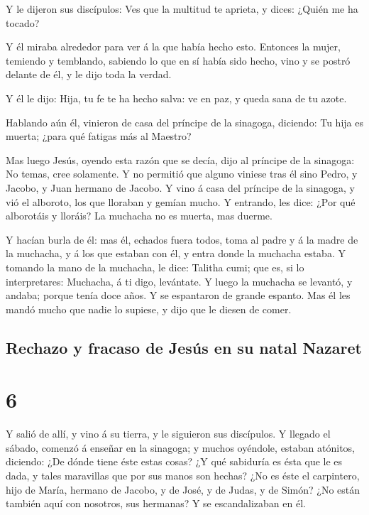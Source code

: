  Y le dijeron sus discípulos: Ves que la multitud te
aprieta, y dices: ¿Quién me ha tocado?

 Y él miraba alrededor para ver á la que había hecho
esto.  Entonces la mujer, temiendo y temblando, sabiendo
lo que en sí había sido hecho, vino y se postró delante de él, y le dijo
toda la verdad.

 Y él le dijo: Hija, tu fe te ha hecho salva: ve en paz,
y queda sana de tu azote.

 Hablando aún él, vinieron de casa del príncipe de la
sinagoga, diciendo: Tu hija es muerta; ¿para qué fatigas más al Maestro?

 Mas luego Jesús, oyendo esta razón que se decía, dijo al
príncipe de la sinagoga: No temas, cree solamente.  Y no
permitió que alguno viniese tras él sino Pedro, y Jacobo, y Juan hermano
de Jacobo.  Y vino á casa del príncipe de la sinagoga, y
vió el alboroto, los que lloraban y gemían mucho.  Y
entrando, les dice: ¿Por qué alborotáis y lloráis? La muchacha no es
muerta, mas duerme.

 Y hacían burla de él: mas él, echados fuera todos, toma
al padre y á la madre de la muchacha, y á los que estaban con él, y
entra donde la muchacha estaba.  Y tomando la mano de la
muchacha, le dice: Talitha cumi; que es, si lo interpretares: Muchacha,
á ti digo, levántate.  Y luego la muchacha se levantó, y
andaba; porque tenía doce años. Y se espantaron de grande espanto.
 Mas él les mandó mucho que nadie lo supiese, y dijo que
le diesen de comer.

\hypertarget{rechazo-y-fracaso-de-jesuxfas-en-su-natal-nazaret}{%
\subsection{Rechazo y fracaso de Jesús en su natal
Nazaret}\label{rechazo-y-fracaso-de-jesuxfas-en-su-natal-nazaret}}

\hypertarget{section-5}{%
\section{6}\label{section-5}}

 Y salió de allí, y vino á su tierra, y le siguieron sus
discípulos.  Y llegado el sábado, comenzó á enseñar en la
sinagoga; y muchos oyéndole, estaban atónitos, diciendo: ¿De dónde tiene
éste estas cosas? ¿Y qué sabiduría es ésta que le es dada, y tales
maravillas que por sus manos son hechas?  ¿No es éste el
carpintero, hijo de María, hermano de Jacobo, y de José, y de Judas, y
de Simón? ¿No están también aquí con nosotros, sus hermanas? Y se
escandalizaban en él.


